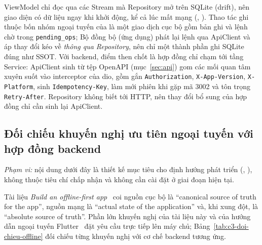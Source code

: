 ViewModel chỉ đọc qua các Stream mà Repository mở trên SQLite (drift), nên giao diện có dữ liệu ngay khi khởi động, kể cả lúc mất mạng (, ). Thao tác ghi thuộc bốn nhóm ngoại tuyến của  là một giao dịch cục bộ gồm bản ghi và lệnh chờ trong \texttt{pending\_ops}; Bộ đồng bộ (ứng dụng) phát lại lệnh qua ApiClient và áp thay đổi kéo về \emph{thông qua Repository}, nên chỉ một thành phần ghi SQLite đúng như SSOT. Với backend, điểm then chốt là hợp đồng chỉ chạm tới tầng Service: ApiClient sinh từ tệp OpenAPI (mục~\ref{sec:api}) gom các mối quan tâm xuyên suốt vào interceptor của dio, gồm gắn \texttt{Authorization}, \texttt{X-App-Version}, \texttt{X-Platform}, sinh \texttt{Idempotency-Key}, làm mới phiên khi gặp mã 3002 và tôn trọng \texttt{Retry-After}. Repository không biết tới HTTP, nên thay đổi bổ sung của hợp đồng chỉ cần sinh lại ApiClient.

\subsection{Đối chiếu khuyến nghị ưu tiên ngoại tuyến với hợp đồng backend}\label{ssec:doi-chieu-offline-first}

\emph{Phạm vi:} nội dung dưới đây là thiết kế mục tiêu cho định hướng phát triển (, ), không thuộc tiêu chí chấp nhận và không cần cài đặt ở giai đoạn hiện tại.

Tài liệu \emph{Build an offline-first app}~\cite{androidoffline} coi nguồn cục bộ là “canonical source of truth for the app”, nguồn mạng là “actual state of the application” và, khi xung đột, là “absolute source of truth”. Phần lớn khuyến nghị của tài liệu này và của hướng dẫn ngoại tuyến Flutter~\cite{flutteroffline} đặt yêu cầu trực tiếp lên máy chủ; Bảng~\ref{tab:c3-doi-chieu-offline} đối chiếu từng khuyến nghị với cơ chế backend tương ứng.

